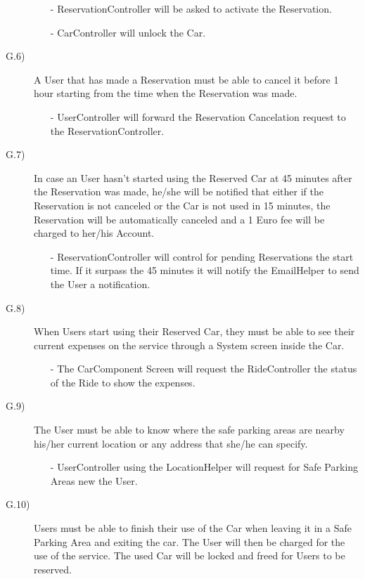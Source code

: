 \documentclass[a4paper]{article}
\begin{document}
\begin{description}
\begin{itemize}
	\item[-]ReservationController will be asked to activate the Reservation.
	\item[-]CarController will unlock the Car.	
\end{itemize}
\newpage
\item [G.6)]A User that has made a Reservation must be able to cancel it before 1 hour starting from the time when the Reservation was made.
\begin{itemize}
	\item[-]UserController will forward the Reservation Cancelation request to the ReservationController.
\end{itemize}
\item [G.7)]In case an User hasn't started using the Reserved Car at 45 minutes after the Reservation was made, he/she will be notified that either if the Reservation is not canceled or the Car is not used in 15 minutes, the Reservation will be automatically canceled and a 1 Euro fee will be charged to her/his Account.
\begin{itemize}
	\item[-]ReservationController will control for pending Reservations the start time. If it surpass the 45 minutes it will notify the EmailHelper to send the User a notification.
\end{itemize}
\item [G.8)]When Users start using their Reserved Car, they must be able to see their current expenses on the service through a System screen inside the Car.
\begin{itemize}
	\item[-]The CarComponent Screen will request the RideController the status of the Ride to show the expenses.
\end{itemize}
\item [G.9)]The User must be able to know where the safe parking areas are nearby his/her current location or any address that she/he can specify.
\begin{itemize}
	\item[-]UserController using the LocationHelper will request for Safe Parking Areas new the User.
\end{itemize}
\item [G.10)]Users must be able to finish their use of the Car when leaving it in a Safe Parking Area and exiting the car. The User will then be charged for the use of the service. The used Car will be locked and freed for Users to be reserved.
\begin{itemize}

\end{itemize}
\end{description}
\end{document}
